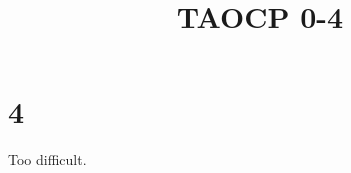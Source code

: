 \documentclass{article}
\title{TAOCP 0\mbox{-}4}
\begin{document}
\maketitle

\section*{4}

Too difficult.

\unsolved{}
\end{document}
